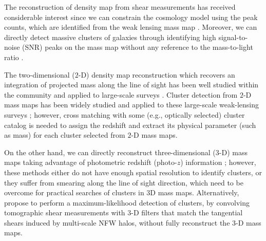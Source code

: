 \documentclass[twocolumn]{aastex63}
\begin{document}

The reconstruction of density map from shear measurements has received
considerable interest since
we can constrain the cosmology model using the peak counts, which are
identified from the weak lensing mass map
\citep{WL-massMap-peakcounts-Jain2000,WL-massMap-peakcountsAna-Fan2010,WL-massMap-peakcountsFM-Lin2016}.
Moreover, we can directly detect massive clusters of galaxies through
identifying high signal-to-noise (SNR) peaks on the mass map without any
reference to the mass-to-light ratio
\citep{WL-massMap-clusDet-Schneider1996,WL-massMap-clusDet-Hamana2004}.

The two-dimensional ($2$-D) density map reconstruction which recovers an
integration of projected mass along the line of sight has been well studied
within the community
\citep{massMap-KS1993,WL-massMap-Glimpse2D-Lanusse2016,sparseBaysianMassMap-Price2020}
and applied to large-scale surveys
\citep{HSC1-massMaps,massMapDES-Chang2018,DES-SV-massMap-sparsity}.
Cluster detection from $2$-D mass maps has been widely studied and applied to
these large-scale weak-lensing surveys
\citep{WL-massMap-clusDet-CFHT-Shan2012,WL-massMap-clusDet-HSC-Miyazaki2018,WL-massMap-clusDet-HSC-Hamana2020};
however, cross matching with some (e.g., optically selected) cluster catalog is
needed to assign the redshift and extract its physical parameter (such as mass)
for each cluster selected from $2$-D mass maps.

On the other hand, we can directly reconstruct three-dimensional ($3$-D) mass
maps taking advantage of photometric redshift (photo-$z$) information
\citep{LSS-massMap-Wiener-Simon2009,WL-massMap-VanderPlas2011}; however, these
methods either do not have enough spatial resolution to identify clusters, or
they suffer from smearing along the line of sight direction, which need to be
overcome for practical searches of clusters in 3D mass maps.  Alternatively,
\citet{WL-clusDet-Hennawi2005} propose to perform a maximum-likelihood
detection of clusters, by convolving tomographic shear measurements with $3$-D
filters that match the tangential shears induced by multi-scale NFW halos,
without fully reconstruct the $3$-D mass maps.
\end{document}
